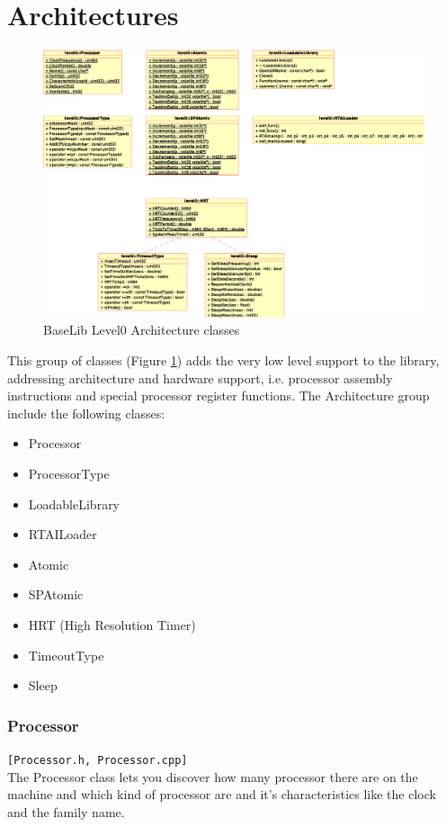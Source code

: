 \section{Architectures}
\begin{figure}[h!]
 \begin{center}
  \includegraphics[width=\textwidth]{level0/level0-arch.eps}
  \caption{BaseLib Level0 Architecture classes}
  \label{f:level0:arch}
 \end{center}
\end{figure}

This group of classes (Figure \ref{f:level0:arch}) adds the very low level support to the library, addressing architecture and hardware support, i.e. processor assembly instructions and special processor register functions.
The Architecture group include the following classes:
\begin{itemize}
 \item Processor
 \item ProcessorType

 \item LoadableLibrary
 \item RTAILoader

 \item Atomic
 \item SPAtomic

 \item HRT (High Resolution Timer) 
 \item TimeoutType
 \item Sleep
\end{itemize}



\subsubsection{Processor}
\texttt{[Processor.h, Processor.cpp]}\\
The Processor class lets you discover how many processor there are on the machine and which kind of processor are and it's characteristics like the clock and the family name.

